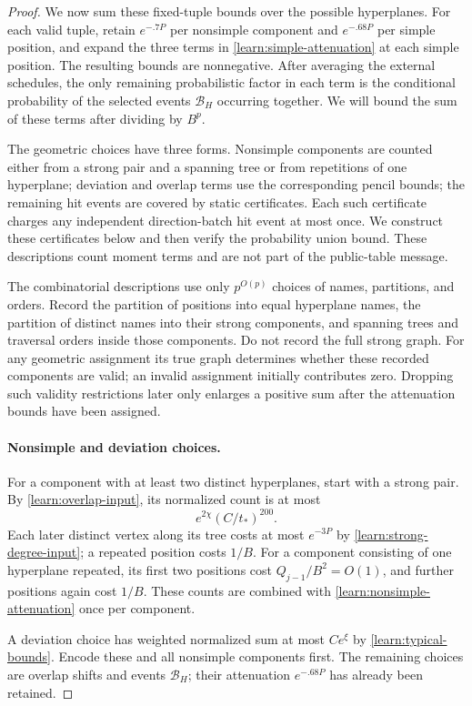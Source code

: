 \begin{proof}
We now sum these fixed-tuple bounds over the possible hyperplanes.
For each valid tuple, retain $e^{-.7P}$ per nonsimple component and
$e^{-.68P}$ per simple position, and expand the three terms in
\eqref{learn:simple-attenuation} at each simple position. The resulting
bounds are nonnegative. After averaging the external schedules, the
only remaining probabilistic factor in each term is the conditional
probability of the selected events $\mathcal B_H$ occurring together.
We will bound the sum of these terms after dividing by $B^p$.

The geometric choices have three forms. Nonsimple components are
counted either from a strong pair and a spanning tree or from repetitions
of one hyperplane; deviation and overlap terms use the corresponding
pencil bounds; the remaining hit events
are covered by static certificates. Each such certificate charges
any independent direction-batch hit event at most once. We construct
these certificates below and then verify the probability union bound.
These descriptions count moment terms and are not part of the
public-table message.

The combinatorial descriptions use only $p^{O(p)}$ choices of names,
partitions, and orders. Record the partition
of positions into equal hyperplane names, the partition of distinct
names into their strong components, and spanning trees and traversal
orders inside those components. Do not record the full strong graph.
For any geometric assignment its true graph determines whether these
recorded components are valid; an invalid assignment initially contributes
zero. Dropping such validity restrictions later only enlarges a positive
sum after the attenuation bounds have been assigned.

\paragraph{Nonsimple and deviation choices.}
For a component with at least two distinct hyperplanes, start with a
strong pair. By \eqref{learn:overlap-input}, its normalized count is
at most
\[
 e^{2\chi}(C/t_*)^{200}.
\]
Each later distinct vertex along its tree costs at most $e^{-3P}$ by
\eqref{learn:strong-degree-input}; a repeated position costs $1/B$.
For a component consisting of one hyperplane repeated, its first two
positions cost $Q_{j-1}/B^2=O(1)$, and further positions again cost
$1/B$. These counts are combined with
\eqref{learn:nonsimple-attenuation} once per component.

A deviation choice has weighted normalized sum at most
$Ce^\xi$ by \eqref{learn:typical-bounds}. Encode these and all nonsimple
components first. The remaining choices are overlap shifts and events
$\mathcal B_H$; their attenuation $e^{-.68P}$ has already been retained.


\end{proof}
